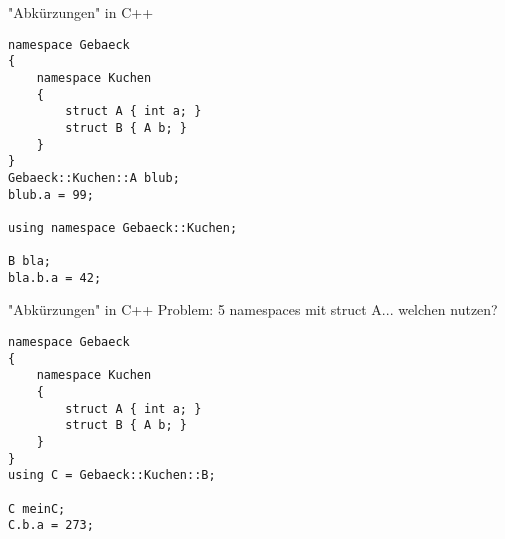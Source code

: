 

\begin{frame}[fragile]{"Abkürzungen" in C++}
	
	\begin{lstlisting}[]
namespace Gebaeck
{
	namespace Kuchen
	{
		struct A { int a; }
		struct B { A b; }
	}
}
Gebaeck::Kuchen::A blub;
blub.a = 99;

using namespace Gebaeck::Kuchen;

B bla;
bla.b.a = 42;
	\end{lstlisting}
\end{frame}

\begin{frame}[fragile]{"Abkürzungen" in C++}
	Problem: 5 namespaces mit struct A... welchen nutzen?

	\begin{lstlisting}[]
namespace Gebaeck
{
	namespace Kuchen
	{
		struct A { int a; }
		struct B { A b; }
	}
}
using C = Gebaeck::Kuchen::B;

C meinC;
C.b.a = 273;
	\end{lstlisting}
\end{frame}


